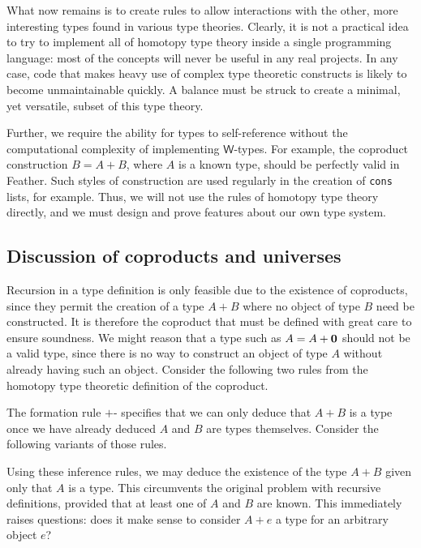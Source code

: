 \documentclass[UKenglish, 11pt, a4paper, parskip=half]{scrbook}
\newcommand{\inlinecode}[1]{\lstinline{#1}}
\begin{document}
What now remains is to create rules to allow interactions with the other, more interesting types found in various type theories.
Clearly, it is not a practical idea to try to implement all of homotopy type theory inside a single programming language: most of the concepts will never be useful in any real projects.
In any case, code that makes heavy use of complex type theoretic constructs is likely to become unmaintainable quickly.
A balance must be struck to create a minimal, yet versatile, subset of this type theory.

Further, we require the ability for types to self-reference without the computational complexity of implementing \( \mathsf{W} \)-types.
For example, the coproduct construction \( B = A + B \), where \( A \) is a known type, should be perfectly valid in Feather.
Such styles of construction are used regularly in the creation of \inlinecode{cons} lists, for example.
Thus, we will not use the rules of homotopy type theory directly, and we must design and prove features about our own type system.

\subsection{Discussion of coproducts and universes}
Recursion in a type definition is only feasible due to the existence of coproducts, since they permit the creation of a type \( A + B \) where no object of type \( B \) need be constructed.
It is therefore the coproduct that must be defined with great care to ensure soundness.
We might reason that a type such as \( A = A + \mathbf{0} \) should not be a valid type, since there is no way to construct an object of type \( A \) without already having such an object.
Consider the following two rules from the homotopy type theoretic definition of the coproduct.
The formation rule \( + \)-\rform{} specifies that we can only deduce that \( A+B \) is a type once we have already deduced \( A \) and \( B \) are types themselves.
Consider the following variants of those rules.
Using these inference rules, we may deduce the existence of the type \( A+B \) given only that \( A \) is a type.
This circumvents the original problem with recursive definitions, provided that at least one of \( A \) and \( B \) are known.
This immediately raises questions: does it make sense to consider \( A + e \) a type for an arbitrary object \( e \)?
\end{document}
